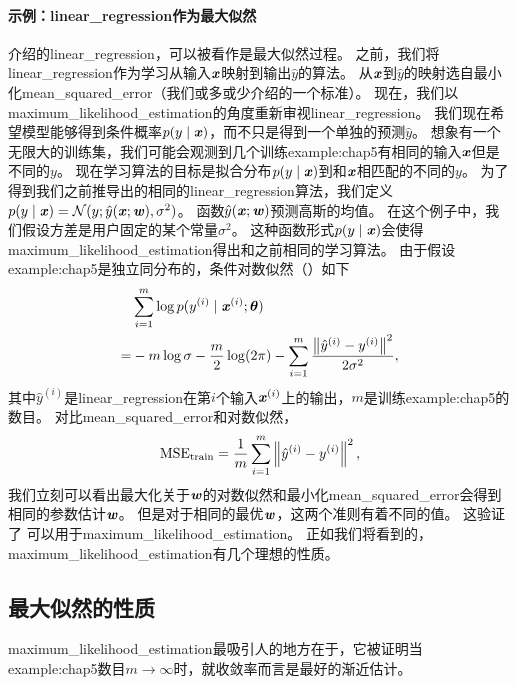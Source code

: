 
\paragraph{示例：\gls{linear_regression}作为最大似然} 介绍的\gls{linear_regression}，可以被看作是最大似然过程。
之前，我们将\gls{linear_regression}作为学习从输入$\boldsymbol{\mathit{x}}$映射到输出$\hat{y}$的算法。
从$\boldsymbol{\mathit{x}}$到$\hat{y}$的映射选自最小化\gls{mean_squared_error}（我们或多或少介绍的一个标准）。
现在，我们以\gls{maximum_likelihood_estimation}的角度重新审视\gls{linear_regression}。
我们现在希望模型能够得到条件概率$p(y \mid \boldsymbol{\mathit{x}})$，而不只是得到一个单独的预测$\hat{y}$。
想象有一个无限大的训练集，我们可能会观测到几个训练\gls{example:chap5}有相同的输入$\boldsymbol{\mathit{x}}$但是不同的$y$。
现在学习算法的目标是拟合分布$p(y \mid \boldsymbol{\mathit{x}})$到和$\boldsymbol{\mathit{x}}$相匹配的不同的$y$。
为了得到我们之前推导出的相同的\gls{linear_regression}算法，我们定义$p(y \mid \boldsymbol{\mathit{x}}) = \mathcal{N}(y; \hat{y}(\boldsymbol{\mathit{x}}; \boldsymbol{\mathit{w}}), \sigma^2)$。
函数$\hat{y}(\boldsymbol{\mathit{x}}; \boldsymbol{\mathit{w}})$预测高斯的均值。
在这个例子中，我们假设方差是用户固定的某个常量$\sigma^2$。
这种函数形式$p(y \mid \boldsymbol{\mathit{x}})$会使得\gls{maximum_likelihood_estimation}得出和之前相同的学习算法。
由于假设\gls{example:chap5}是独立同分布的，条件对数似然（）如下
\begin{align}
     & \sum_{i=1}^m \log p(y^{(i)} \mid \boldsymbol{\mathit{x}}^{(i)}; \boldsymbol{\theta}) \\
    =& -m \log\sigma - \frac{m}{2} \log(2\pi) - \sum_{i=1}^m \frac{ \left\lVert\hat{y}^{(i)} - y^{(i)} \right\rVert^2 }{2\sigma^2},
\end{align}
其中$\hat{y}^{(i)}$是\gls{linear_regression}在第$i$个输入$\boldsymbol{\mathit{x}}^{(i)}$上的输出，$m$是训练\gls{example:chap5}的数目。
对比\gls{mean_squared_error}和对数似然，
\begin{equation}
    \text{MSE}_{\text{train}} = \frac{1}{m} \sum_{i=1}^m \left\lVert\hat{y}^{(i)} - y^{(i)}\right\rVert^2,
\end{equation}
我们立刻可以看出最大化关于$\boldsymbol{\mathit{w}}$的对数似然和最小化\gls{mean_squared_error}会得到相同的参数估计$\boldsymbol{\mathit{w}}$。
但是对于相同的最优$\boldsymbol{\mathit{w}}$，这两个准则有着不同的值。
这验证了\,\,可以用于\gls{maximum_likelihood_estimation}。
正如我们将看到的，\gls{maximum_likelihood_estimation}有几个理想的性质。


\subsection{最大似然的性质}
\label{sec:properties_of_maximum_likelihood}
\gls{maximum_likelihood_estimation}最吸引人的地方在于，它被证明当\gls{example:chap5}数目$m\to\infty$时，就收敛率而言是最好的渐近估计。

